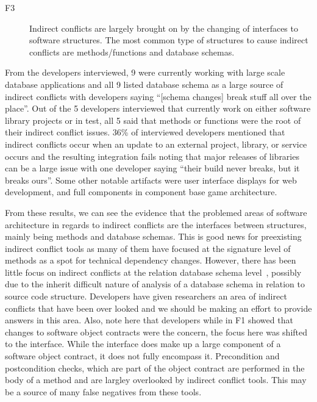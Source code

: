 \documentclass[conference]{IEEEtran}
\makeatletter
\def\namedlabel#1#2{\begingroup
   \def\@currentlabel{#2}%
   \label{#1}\endgroup
}
\makeatother
\begin{document}
\begin{description}
	\item[F3\namedlabel{itm:f3}{F3}] Indirect conflicts are largely brought on by the changing of interfaces to software structures. The most common type of structures
						to cause indirect conflicts are methods/functions and database schemas.
\end{description}

From the developers interviewed, 9 were currently working with large scale database applications and all 9 listed database
schema as a large source of indirect conflicts with developers saying ``[schema changes] break stuff all over the place''.
Out of the 5 developers interviewed that currently work on either software
library projects or in test, all 5 said that methods or functions were the root of their indirect conflict issues. 
36\% of interviewed developers mentioned that indirect conflicts occur when an update to an external project, library, or service occurs and the resulting 
integration fails noting that major releases of libraries can be a large issue with one developer saying 
``their build never breaks, but it breaks ours''. Some
other notable artifacts were user interface displays for web development, and full components in component base game
architecture. 

From these results, we can see the evidence that the problemed areas of software architecture in regards to indirect conflicts are
the interfaces between structures, mainly being methods and database schemas. This is good news for preexisting indirect conflict tools as
many of them have focused at the signature level of methods as a spot for technical dependency changes. However, there has been little focus on indirect
conflicts at the relation database schema level~\cite{Maule:2008:IAD}, possibly due to the inherit difficult nature
of analysis of a database schema in relation to source code structure. Developers have given researchers an area of indirect conflicts that have been
over looked and we should be making an effort to provide answers in this area. Also, note here that developers while in F1 showed that changes to software
object contracts were the concern, the focus here was shifted to the interface. While the interface does make up a large component of a software object contract,
it does not fully encompass it. Precondition and postcondition checks, which are part of the object contract are performed in the body of a method and are largley overlooked
by indirect conflict tools. This may be a source of many false negatives from these tools.
\end{document}
